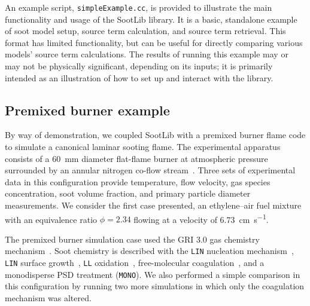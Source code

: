 \documentclass[preprint,letterpaper]{elsarticle}
\begin{document}
An example script, \texttt{simpleExample.cc}, is provided to illustrate the main functionality and usage of the SootLib library. It is a basic, standalone example of soot model setup, source term calculation, and source term retrieval. This format has limited functionality, but can be useful for directly comparing various models' source term calculations. The results of running this example may or may not be physically significant, depending on its inputs; it is primarily intended as an illustration of how to set up and interact with the library.

\subsection{Premixed burner example}
\label{s:soot-examples-premixed}

By way of demonstration, we coupled SootLib with a premixed burner flame code to simulate a canonical laminar sooting flame. The experimental apparatus consists of a \qty{60}{\mm} diameter flat-flame burner at atmospheric pressure surrounded by an annular nitrogen co-flow stream~\cite{Xu_1997,Menon_2007}. Three sets of experimental data in this configuration provide temperature, flow velocity, gas species concentration, soot volume fraction, and primary particle diameter measurements. We consider the first case presented, an ethylene--air fuel mixture with an equivalence ratio $\phi=2.34$ flowing at a velocity of \qty{6.73}{\cm\per\s}.

The premixed burner simulation case used the GRI 3.0 gas chemistry mechanism~\cite{Smith_2002}. Soot chemistry is described with the \texttt{LIN} nucleation mechanism~\cite{Lindstedt_2005}, \texttt{LIN} surface growth~\cite{Lindstedt_1994}, \texttt{LL} oxidation~\cite{Leung_1991}, free-molecular coagulation~\cite{Seinfeld_2016}, and a monodisperse PSD treatment (\texttt{MONO}). We also performed a simple comparison in this configuration by running two more simulations in which only the coagulation mechanism was altered.
\end{document}

